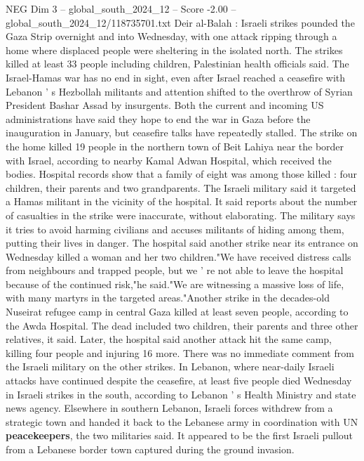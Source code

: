 \begin{textsample}{NEG Dim 3 – global\_south\_2024\_12 – Score -2.00 – global\_south\_2024\_12/118735701.txt}  \label{ex:f3_neg_061}
Deir al-Balah : Israeli strikes pounded the Gaza Strip overnight and into Wednesday, with one attack ripping through a home where displaced people were sheltering in the isolated north.
The strikes killed at least 33 people including children, Palestinian health officials said.
The Israel-Hamas war has no end in sight, even after Israel reached a ceasefire with Lebanon ' s Hezbollah militants and attention shifted to the overthrow of Syrian President Bashar Assad by insurgents.
Both the current and incoming US administrations have said they hope to end the war in Gaza before the inauguration in January, but ceasefire talks have repeatedly stalled.
The strike on the home killed 19 people in the northern town of Beit Lahiya near the border with Israel, according to nearby Kamal Adwan Hospital, which received the bodies.
Hospital records show that a family of eight was among those killed : four children, their parents and two grandparents.
The Israeli military said it targeted a Hamas militant in the vicinity of the hospital.
It said reports about the number of casualties in the strike were inaccurate, without elaborating.
The military says it tries to avoid harming civilians and accuses militants of hiding among them, putting their lives in danger.
The hospital said another strike near its entrance on Wednesday killed a woman and her two children."We have received distress calls from neighbours and trapped people, but we ' re not able to leave the hospital because of the continued risk,"he said."We are witnessing a massive loss of life, with many martyrs in the targeted areas."Another strike in the decades-old Nuseirat refugee camp in central Gaza killed at least seven people, according to the Awda Hospital.
The dead included two children, their parents and three other relatives, it said.
Later, the hospital said another attack hit the same camp, killing four people and injuring 16 more.
There was no immediate comment from the Israeli military on the other strikes.
In Lebanon, where near-daily Israeli attacks have continued despite the ceasefire, at least five people died Wednesday in Israeli strikes in the south, according to Lebanon ' s Health Ministry and state news agency.
Elsewhere in southern Lebanon, Israeli forces withdrew from a strategic town and handed it back to the Lebanese army in coordination with UN \textbf{peacekeepers}, the two militaries said.
It appeared to be the first Israeli pullout from a Lebanese border town captured during the ground invasion.

\end{textsample}

